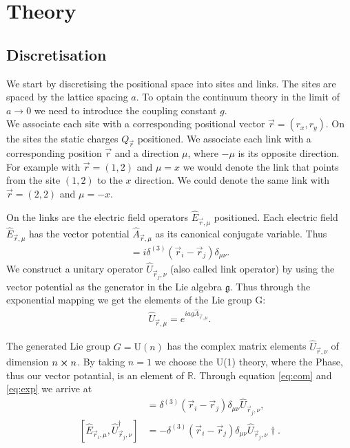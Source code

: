 \section{Theory}
\subsection{Discretisation}
We start by discretising the positional space into sites and links. The sites are spaced by the lattice spacing $a$. To optain the continuum theory in the limit of $a\rightarrow 0$ we need to introduce the coupling constant $g$\cite{RevModPhys.51.659}.
\\
We associate each site with a corresponding positional vector $\vec{r}=(r_x, r_y)$. On the sites the static charges $Q_{\vec{r}}$ positioned. We associate each link with a corresponding position $\vec{r}$ and a direction $\mu$, where $-\mu$ is its opposite direction. For example with $\vec{r}=(1, 2)$ and $\mu=x$ we would denote the link that points from the site $(1, 2)$ to the $x$ direction. We could denote the same link with $\vec{r}=(2, 2)$ and $\mu=-x$.

On the links are the electric field operators $\hat{E}_{\vec{r},\mu}$ positioned. Each electric field $\hat{E}_{\vec{r}, \mu}$ has the vector potential $\hat{A}_{\vec{r}, \mu}$ as its canonical conjugate variable. Thus
\begin{align}
  [\hat{E}_{\vec{r}_{i}, \mu}, \hat{A}_{\vec{r}_{j}, \nu}]=i\delta^{(3)}(\vec{r}_{i}-\vec{r}_{j})\delta_{\mu\nu}.\label{eq:com}
\end{align}
We construct a unitary operator $\hat{U}_{\vec{r}_{j}, \nu}$ (also called link operator) by using the vector potential as the generator in the Lie algebra $\mathfrak{g}$. Thus through the exponential mapping we get the elements of the Lie group G:
\begin{align}
	\hat{U}_{\vec{r}, \mu} = e^{iag\hat{A}_{\vec{r}, \mu}}.\label{eq:exp}
\end{align}

The generated Lie group $G=\text{U}(n)$ has the complex matrix elements $\hat{U}_{\vec{r}, \nu}$ of dimension $n\cross n$. By taking $n=1$ we choose the U(1) theory, where the Phase, thus our vector potantial, is an element of $\mathbb{R}$. Through equation \ref{eq:com} and \ref{eq:exp} we arrive at
\begin{align}
  [\hat{E}_{\vec{r}_{i}, \mu}, \hat{U}_{\vec{r}_{j}, \nu}]      & =\delta^{(3)}(\vec{r}_{i}-\vec{r}_{j})\delta_{\mu\nu}\hat{U}_{\vec{r}_{j}, \nu},\label{eq:comu1}       \\
  [\hat{E}_{\vec{r}_{i}, \mu}, \hat{U}_{\vec{r}_{j}, \nu}^\dag] & =-\delta^{(3)}(\vec{r}_{i}-\vec{r}_{j})\delta_{\mu\nu}\hat{U}_{\vec{r}_{j}, \nu}\dag. \label{eq:comu2}
\end{align}

